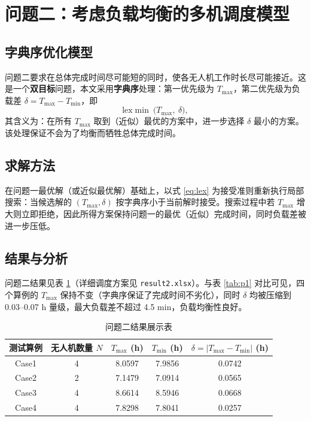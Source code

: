 \documentclass[12pt,a4paper]{ctexart}
\begin{document}
\section{问题二：考虑负载均衡的多机调度模型}

\subsection{字典序优化模型}

问题二要求在总体完成时间尽可能短的同时，使各无人机工作时长尽可能接近。这是一个\textbf{双目标}问题，本文采用\textbf{字典序}处理：第一优先级为 $T_{\max}$，第二优先级为负载差 $\delta=T_{\max}-T_{\min}$，即
\begin{equation}
  \text{lex}\min\ \big(T_{\max},\ \delta\big),
  \label{eq:lex}
\end{equation}
其含义为：在所有 $T_{\max}$ 取到（近似）最优的方案中，进一步选择 $\delta$ 最小的方案。该处理保证不会为了均衡而牺牲总体完成时间。

\subsection{求解方法}

在问题一最优解（或近似最优解）基础上，以式 \eqref{eq:lex} 为接受准则重新执行局部搜索：当候选解的 $(T_{\max},\delta)$ 按字典序小于当前解时接受。搜索过程中若 $T_{\max}$ 增大则立即拒绝，因此所得方案保持问题一的最优（近似）完成时间，同时负载差被进一步压低。

\subsection{结果与分析}

问题二结果见表 \ref{tab:p2}（详细调度方案见 \texttt{result2.xlsx}）。与表 \ref{tab:p1} 对比可见，四个算例的 $T_{\max}$ 保持不变（字典序保证了完成时间不劣化），同时 $\delta$ 均被压缩到 0.03--0.07 h 量级，最大负载差不超过 4.5 min，负载均衡性良好。

\begin{table}[H]
  \centering
  \caption{问题二结果展示表}
  \label{tab:p2}
  \small
  \begin{tabular}{ccccc}
    \toprule
    测试算例 & 无人机数量 $N$ & $T_{\max}$ (h) & $T_{\min}$ (h) & $\delta=|T_{\max}-T_{\min}|$ (h) \\
    \midrule
    Case1 & 4 & 8.0597 & 7.9856 & 0.0742 \\
    Case2 & 2 & 7.1479 & 7.0914 & 0.0565 \\
    Case3 & 4 & 8.6614 & 8.5946 & 0.0668 \\
    Case4 & 4 & 7.8298 & 7.8041 & 0.0257 \\
    \bottomrule
  \end{tabular}
\end{table}
\end{document}
